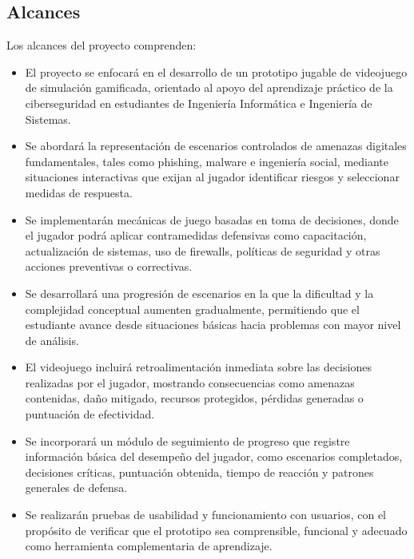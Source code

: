 \subsection{Alcances}

Los alcances del proyecto comprenden:

\begin{itemize}
  \item El proyecto se enfocará en el desarrollo de un prototipo jugable de videojuego de simulación gamificada, orientado al apoyo del aprendizaje práctico de la ciberseguridad en estudiantes de Ingeniería Informática e Ingeniería de Sistemas.
  \item Se abordará la representación de escenarios controlados de amenazas digitales fundamentales, tales como phishing, malware e ingeniería social, mediante situaciones interactivas que exijan al jugador identificar riesgos y seleccionar medidas de respuesta.
  \item Se implementarán mecánicas de juego basadas en toma de decisiones, donde el jugador podrá aplicar contramedidas defensivas como capacitación, actualización de sistemas, uso de firewalls, políticas de seguridad y otras acciones preventivas o correctivas.
  \item Se desarrollará una progresión de escenarios en la que la dificultad y la complejidad conceptual aumenten gradualmente, permitiendo que el estudiante avance desde situaciones básicas hacia problemas con mayor nivel de análisis.
  \item El videojuego incluirá retroalimentación inmediata sobre las decisiones realizadas por el jugador, mostrando consecuencias como amenazas contenidas, daño mitigado, recursos protegidos, pérdidas generadas o puntuación de efectividad.
  \item Se incorporará un módulo de seguimiento de progreso que registre información básica del desempeño del jugador, como escenarios completados, decisiones críticas, puntuación obtenida, tiempo de reacción y patrones generales de defensa.
  \item Se realizarán pruebas de usabilidad y funcionamiento con usuarios, con el propósito de verificar que el prototipo sea comprensible, funcional y adecuado como herramienta complementaria de aprendizaje.
\end{itemize}
